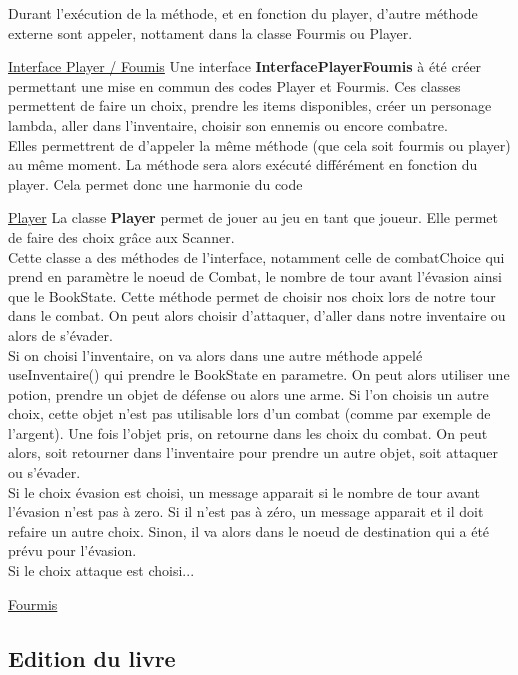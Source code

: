 			Durant l'exécution de la méthode, et en fonction du player, d'autre méthode externe sont appeler, nottament dans la classe Fourmis ou Player.

		\underline{Interface Player / Foumis}
			Une interface \textbf{InterfacePlayerFoumis} à été créer permettant une mise en commun des codes Player et Fourmis. Ces classes permettent de faire un choix, prendre les items disponibles, créer un personage lambda, aller dans l'inventaire, choisir son ennemis ou encore combatre.\\
			Elles permettrent de d'appeler la même méthode (que cela soit fourmis ou player) au même moment. La méthode sera alors exécuté différément en fonction du player. Cela permet donc une harmonie du code

		\underline{Player}
			La classe \textbf{Player} permet de jouer au jeu en tant que joueur. Elle permet de faire des choix grâce aux Scanner.\\ Cette classe a des méthodes de l'interface, notamment celle de combatChoice qui prend en paramètre le noeud de Combat, le nombre de tour avant l'évasion ainsi que le BookState. Cette méthode permet de choisir nos choix lors de notre tour dans le combat. On peut alors choisir d'attaquer, d'aller dans notre inventaire ou alors de s'évader.\\
			Si on choisi l'inventaire, on va alors dans une autre méthode appelé useInventaire() qui prendre le BookState en parametre. On peut alors utiliser une potion, prendre un objet de défense ou alors une arme. Si l'on choisis un autre choix, cette objet n'est pas utilisable lors d'un combat (comme par exemple de l'argent). Une fois l'objet pris, on retourne dans les choix du combat. On peut alors, soit retourner dans l'inventaire pour prendre un autre objet, soit attaquer ou s'évader.\\
			Si le choix évasion est choisi, un message apparait si le nombre de tour avant l'évasion n'est pas à zero. Si il n'est pas à zéro, un message apparait et il doit refaire un autre choix. Sinon, il va alors dans le noeud de destination qui a été prévu pour l'évasion.\\
			Si le choix attaque est choisi...


		\underline{Fourmis}

		\subsection{Edition du livre}
